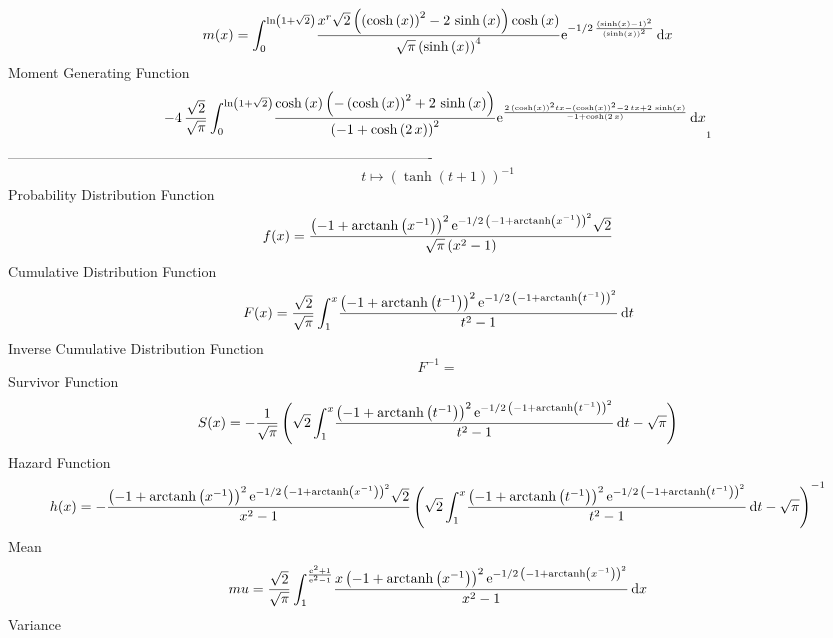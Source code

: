 \documentclass[12pt]{article}
\begin{document}
 $$ m(x) = \int_{0}^{\ln  \left( 1+\sqrt {2} \right) }\!{\frac {{x}^{r}\sqrt {2}
 \left(  \left( \cosh \left( x \right)  \right) ^{2}-2\,\sinh \left( x
 \right)  \right) \cosh \left( x \right) }{\sqrt {\pi} \left( \sinh
 \left( x \right)  \right) ^{4}}{{\rm e}^{-1/2\,{\frac { \left( \sinh
 \left( x \right) -1 \right) ^{2}}{ \left( \sinh \left( x \right) 
 \right) ^{2}}}}}}\,{\rm d}x
$$ Moment Generating Function 
 $$-4\,{\frac {\sqrt {2}}{\sqrt {\pi}}\int_{0}^{\ln  \left( 1+\sqrt {2}
 \right) }\!{\frac {\cosh \left( x \right)  \left( - \left( \cosh
 \left( x \right)  \right) ^{2}+2\,\sinh \left( x \right)  \right) }{
 \left( -1+\cosh \left( 2\,x \right)  \right) ^{2}}{{\rm e}^{{\frac {2
\, \left( \cosh \left( x \right)  \right) ^{2}tx- \left( \cosh \left( 
x \right)  \right) ^{2}-2\,tx+2\,\sinh \left( x \right) }{-1+\cosh
 \left( 2\,x \right) }}}}}\,{\rm d}x}_{{1}}
$$-------------------------------------------------------------------------------------------  \\$$t\mapsto  \left( \tanh \left( t+1 \right)  \right) ^{-1}
$$Probability Distribution Function 
$$  f(x)={\frac { \left( -1+{\rm arctanh} \left({x}^{-1}\right) \right) ^{2}{
{\rm e}^{-1/2\, \left( -1+{\rm arctanh} \left({x}^{-1}\right) \right) 
^{2}}}\sqrt {2}}{\sqrt {\pi} \left( {x}^{2}-1 \right) }}
$$Cumulative Distribution Function  
 $$F(x)={\frac {\sqrt {2}}{\sqrt {\pi}}\int_{1}^{x}\!{\frac { \left( -1+
{\rm arctanh} \left({t}^{-1}\right) \right) ^{2}{{\rm e}^{-1/2\,
 \left( -1+{\rm arctanh} \left({t}^{-1}\right) \right) ^{2}}}}{{t}^{2}
-1}}\,{\rm d}t}
$$ Inverse Cumulative Distribution Function 
  $$F^{-1} = $$Survivor Function 
 $$ S(x)=-{\frac {1}{\sqrt {\pi}} \left( \sqrt {2}\int_{1}^{x}\!{\frac {
 \left( -1+{\rm arctanh} \left({t}^{-1}\right) \right) ^{2}{{\rm e}^{-
1/2\, \left( -1+{\rm arctanh} \left({t}^{-1}\right) \right) ^{2}}}}{{t
}^{2}-1}}\,{\rm d}t-\sqrt {\pi} \right) }
$$ Hazard Function 
 $$ h(x)=-{\frac { \left( -1+{\rm arctanh} \left({x}^{-1}\right) \right) ^{2}{
{\rm e}^{-1/2\, \left( -1+{\rm arctanh} \left({x}^{-1}\right) \right) 
^{2}}}\sqrt {2}}{{x}^{2}-1} \left( \sqrt {2}\int_{1}^{x}\!{\frac {
 \left( -1+{\rm arctanh} \left({t}^{-1}\right) \right) ^{2}{{\rm e}^{-
1/2\, \left( -1+{\rm arctanh} \left({t}^{-1}\right) \right) ^{2}}}}{{t
}^{2}-1}}\,{\rm d}t-\sqrt {\pi} \right) ^{-1}}
$$Mean 
 $$ mu={\frac {\sqrt {2}}{\sqrt {\pi}}\int_{1}^{{\frac {{{\rm e}^{2}}+1}{{
{\rm e}^{2}}-1}}}\!{\frac {x \left( -1+{\rm arctanh} \left({x}^{-1}
\right) \right) ^{2}{{\rm e}^{-1/2\, \left( -1+{\rm arctanh} \left({x}
^{-1}\right) \right) ^{2}}}}{{x}^{2}-1}}\,{\rm d}x}
$$ Variance 
\end{document}
